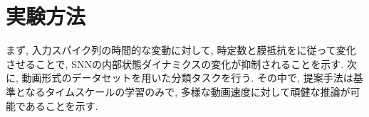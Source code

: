 \section{実験方法}
まず, 入力スパイク列の時間的な変動に対して, 時定数と膜抵抗をに従って変化させることで, SNNの内部状態ダイナミクスの変化が抑制されることを示す.
次に, 動画形式のデータセットを用いた分類タスクを行う.
その中で, 提案手法は基準となるタイムスケールの学習のみで, 多様な動画速度に対して頑健な推論が可能であることを示す.


% 